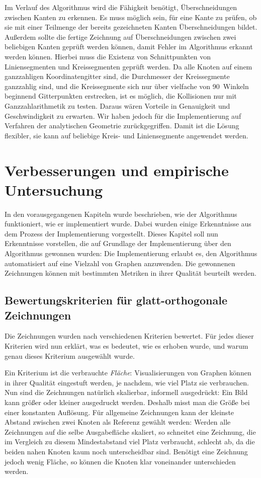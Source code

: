 \documentclass[a4paper]{scrreprt}
\theoremstyle{definition}
\begin{document}
Im Verlauf des Algorithmus wird die Fähigkeit benötigt, Überschneidungen zwischen Kanten zu erkennen. Es muss möglich sein, für eine Kante zu prüfen, ob sie mit einer Teilmenge der bereits gezeichneten Kanten Überschneidungen bildet. Außerdem sollte die fertige Zeichnung auf Überschneidungen zwischen zwei beliebigen Kanten geprüft werden können, damit Fehler im Algorithmus erkannt werden können. Hierbei muss die Existenz von Schnittpunkten von Liniensegmenten und Kreissegmenten geprüft werden. Da alle Knoten auf einem ganzzahligen Koordinatengitter sind, die Durchmesser der Kreissegmente ganzzahlig sind, und die Kreissegmente sich nur über vielfache von 90\textdegree~Winkeln beginnend Gitterpunkten erstrecken, ist es möglich, die Kollisionen nur mit Ganzzahlarithmetik zu testen. Daraus wären Vorteile in Genauigkeit und Geschwindigkeit zu erwarten. Wir haben jedoch für die Implementierung auf Verfahren der analytischen Geometrie zurückgegriffen. Damit ist die Lösung flexibler, sie kann auf beliebige Kreis- und Liniensegmente angewendet werden.


\chapter{Verbesserungen und empirische Untersuchung}
\label{chap:results}

In den vorausgegangenen Kapiteln wurde beschrieben, wie der Algorithmus funktioniert, wie er implementiert wurde. Dabei wurden einige Erkenntnisse aus dem Prozess der Implementierung vorgestellt. Dieses Kapitel soll nun Erkenntnisse vorstellen, die auf Grundlage der Implementierung über den Algorithmus gewonnen wurden: Die Implementierung erlaubt es, den Algorithmus automatisiert auf eine Vielzahl von Graphen anzuwenden. Die gewonnenen Zeichnungen können mit bestimmten Metriken in ihrer Qualität beurteilt werden.

\section{Bewertungskriterien für glatt-orthogonale Zeichnungen}

Die Zeichnungen wurden nach verschiedenen Kriterien bewertet. Für jedes dieser Kriterien wird nun erklärt, was es bedeutet, wie es erhoben wurde, und warum genau dieses Kriterium ausgewählt wurde.

Ein Kriterium ist die verbrauchte \emph{Fläche}: Visualisierungen von Graphen können in ihrer Qualität eingestuft werden, je nachdem, wie viel Platz sie verbrauchen. Nun sind die Zeichnungen natürlich skalierbar, informell ausgedrückt: Ein Bild kann größer oder kleiner ausgedruckt werden. Deshalb misst man die Größe bei einer konstanten Auflösung. Für allgemeine Zeichnungen kann der kleinste Abstand zwischen zwei Knoten als Referenz gewählt werden: Werden alle Zeichnungen auf die selbe Ausgabefläche skaliert, so schneitet eine Zeichnung, die im Vergleich zu diesem Mindestabstand viel Platz verbraucht, schlecht ab, da die beiden nahen Knoten kaum noch unterscheidbar sind. Benötigt eine Zeichnung jedoch wenig Fläche, so können die Knoten klar voneinander unterschieden werden.
\end{document}
